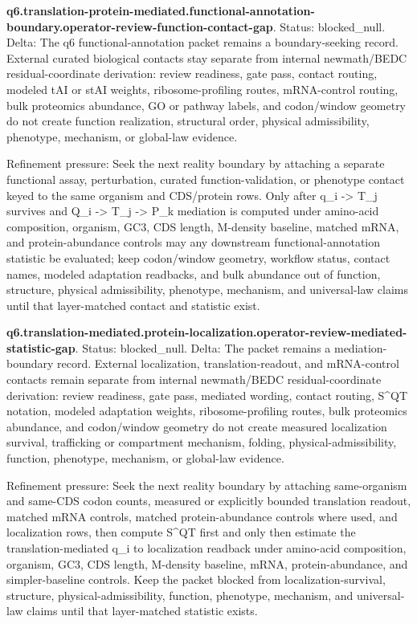 \textbf{q6.translation-protein-mediated.functional-annotation-boundary.operator-review-function-contact-gap}. Status: blocked\_null. Delta: The q6 functional-annotation packet remains a boundary-seeking record. External curated biological contacts stay separate from internal newmath/BEDC residual-coordinate derivation: review readiness, gate pass, contact routing, modeled tAI or stAI weights, ribosome-profiling routes, mRNA-control routing, bulk proteomics abundance, GO or pathway labels, and codon/window geometry do not create function realization, structural order, physical admissibility, phenotype, mechanism, or global-law evidence.

Refinement pressure: Seek the next reality boundary by attaching a separate functional assay, perturbation, curated function-validation, or phenotype contact keyed to the same organism and CDS/protein rows. Only after q\_i -> T\_j survives and Q\_i -> T\_j -> P\_k mediation is computed under amino-acid composition, organism, GC3, CDS length, M-density baseline, matched mRNA, and protein-abundance controls may any downstream functional-annotation statistic be evaluated; keep codon/window geometry, workflow status, contact names, modeled adaptation readbacks, and bulk abundance out of function, structure, physical admissibility, phenotype, mechanism, and universal-law claims until that layer-matched contact and statistic exist.

\textbf{q6.translation-mediated.protein-localization.operator-review-mediated-statistic-gap}. Status: blocked\_null. Delta: The packet remains a mediation-boundary record. External localization, translation-readout, and mRNA-control contacts remain separate from internal newmath/BEDC residual-coordinate derivation: review readiness, gate pass, mediated wording, contact routing, S\textasciicircum{}QT notation, modeled adaptation weights, ribosome-profiling routes, bulk proteomics abundance, and codon/window geometry do not create measured localization survival, trafficking or compartment mechanism, folding, physical-admissibility, function, phenotype, mechanism, or global-law evidence.

Refinement pressure: Seek the next reality boundary by attaching same-organism and same-CDS codon counts, measured or explicitly bounded translation readout, matched mRNA controls, matched protein-abundance controls where used, and localization rows, then compute S\textasciicircum{}QT first and only then estimate the translation-mediated q\_i to localization readback under amino-acid composition, organism, GC3, CDS length, M-density baseline, mRNA, protein-abundance, and simpler-baseline controls. Keep the packet blocked from localization-survival, structure, physical-admissibility, function, phenotype, mechanism, and universal-law claims until that layer-matched statistic exists.

